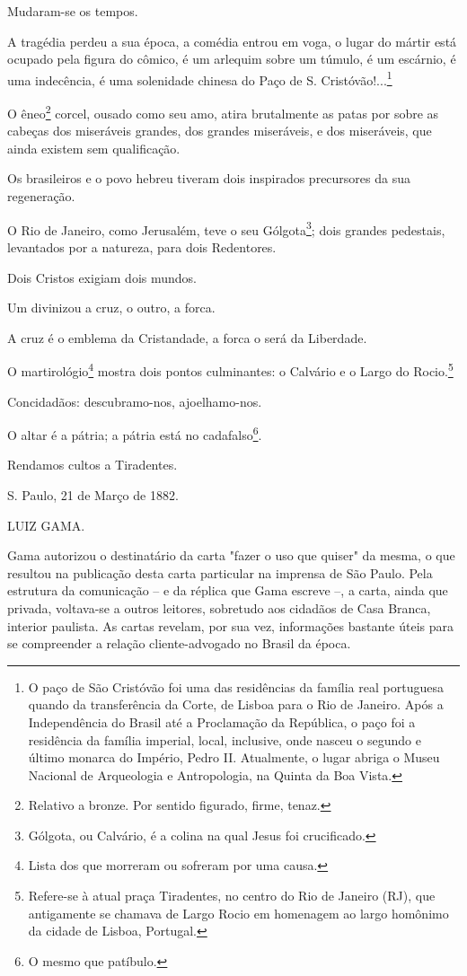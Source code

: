 {Mudaram-se os tempos.

A tragédia perdeu a sua época, a comédia entrou em voga, o lugar do
mártir está ocupado pela figura do cômico, é um arlequim sobre um
túmulo, é um escárnio, é uma indecência, é uma solenidade chinesa do
Paço de S. Cristóvão!...\footnote{O paço de São Cristóvão foi uma das
  residências da família real portuguesa quando da transferência da
  Corte, de Lisboa para o Rio de Janeiro. Após a Independência do Brasil
  até a Proclamação da República, o paço foi a residência da família
  imperial, local, inclusive, onde nasceu o segundo e último monarca do
  Império, Pedro II. Atualmente, o lugar abriga o Museu Nacional de
  Arqueologia e Antropologia, na Quinta da Boa Vista.}

O êneo\footnote{Relativo a bronze. Por sentido figurado, firme, tenaz.}
corcel, ousado como seu amo, atira brutalmente as patas por sobre as
cabeças dos miseráveis grandes, dos grandes miseráveis, e dos
miseráveis, que ainda existem sem qualificação.

Os brasileiros e o povo hebreu tiveram dois inspirados precursores da
sua regeneração.

O Rio de Janeiro, como Jerusalém, teve o seu Gólgota\footnote{Gólgota,
  ou Calvário, é a colina na qual Jesus foi crucificado.}; dois grandes
pedestais, levantados por a natureza, para dois Redentores.

Dois Cristos exigiam dois mundos.

Um divinizou a cruz, o outro, a forca.

A cruz é o emblema da Cristandade, a forca o será da Liberdade.

O martirológio\footnote{Lista dos que morreram ou sofreram por uma
  causa.} mostra dois pontos culminantes: o Calvário e o Largo do
Rocio.\footnote{Refere-se à atual praça Tiradentes, no centro do Rio
  de Janeiro (RJ), que antigamente se chamava de Largo Rocio em
  homenagem ao largo homônimo da cidade de Lisboa, Portugal.}

Concidadãos: descubramo-nos, ajoelhamo-nos.

O altar é a pátria; a pátria está no cadafalso\footnote{O mesmo que
  patíbulo.}.

Rendamos cultos a
Tiradentes.

S. Paulo, 21 de Março de 1882.

LUIZ GAMA.

\pagebreak
\mbox{}\vfill
\thispagestyle{empty}

{\small\noindent
Gama autorizou o destinatário da carta "fazer o uso que quiser" da
mesma, o que resultou na publicação desta carta particular na imprensa
de São Paulo. Pela estrutura da comunicação -- e da réplica que Gama
escreve --, a carta, ainda que privada, voltava-se a outros leitores,
sobretudo aos cidadãos de Casa Branca, interior paulista. As cartas
revelam, por sua vez, informações bastante úteis para se compreender a
relação cliente-advogado no Brasil da época.}

}
